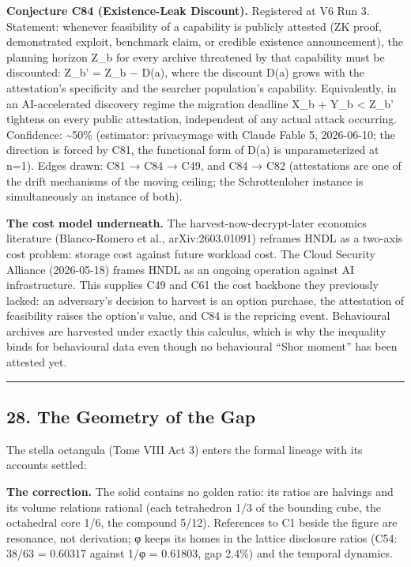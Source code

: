 \documentclass[
]{article}
\begin{document}
\textbf{Conjecture C84 (Existence-Leak Discount).} Registered at V6 Run
3. Statement: whenever feasibility of a capability is publicly attested
(ZK proof, demonstrated exploit, benchmark claim, or credible existence
announcement), the planning horizon Z\_b for every archive threatened by
that capability must be discounted: Z\_b' = Z\_b − D(a), where the
discount D(a) grows with the attestation's specificity and the searcher
population's capability. Equivalently, in an AI-accelerated discovery
regime the migration deadline X\_b + Y\_b \textless{} Z\_b' tightens on
every public attestation, independent of any actual attack occurring.
Confidence: \textasciitilde50\% (estimator: privacymage with Claude
Fable 5, 2026-06-10; the direction is forced by C81, the functional form
of D(a) is unparameterized at n=1). Edges drawn: C81 → C84 → C49, and
C84 → C82 (attestations are one of the drift mechanisms of the moving
ceiling; the Schrottenloher instance is simultaneously an instance of
both).

\textbf{The cost model underneath.} The harvest-now-decrypt-later
economics literature (Blanco-Romero et al., arXiv:2603.01091) reframes
HNDL as a two-axis cost problem: storage cost against future workload
cost. The Cloud Security Alliance (2026-05-18) frames HNDL as an ongoing
operation against AI infrastructure. This supplies C49 and C61 the cost
backbone they previously lacked: an adversary's decision to harvest is
an option purchase, the attestation of feasibility raises the option's
value, and C84 is the repricing event. Behavioural archives are
harvested under exactly this calculus, which is why the inequality binds
for behavioural data even though no behavioural ``Shor moment'' has been
attested yet.

\begin{center}\rule{0.5\linewidth}{0.5pt}\end{center}

\subsection{28. The Geometry of the Gap}\label{the-geometry-of-the-gap}

The stella octangula (Tome VIII Act 3) enters the formal lineage with
its accounts settled:

\textbf{The correction.} The solid contains no golden ratio: its ratios
are halvings and its volume relations rational (each tetrahedron 1/3 of
the bounding cube, the octahedral core 1/6, the compound 5/12).
References to C1 beside the figure are resonance, not derivation; φ
keeps its homes in the lattice disclosure ratios (C54: 38/63 = 0.60317
against 1/φ = 0.61803, gap 2.4\%) and the temporal dynamics.
\end{document}

